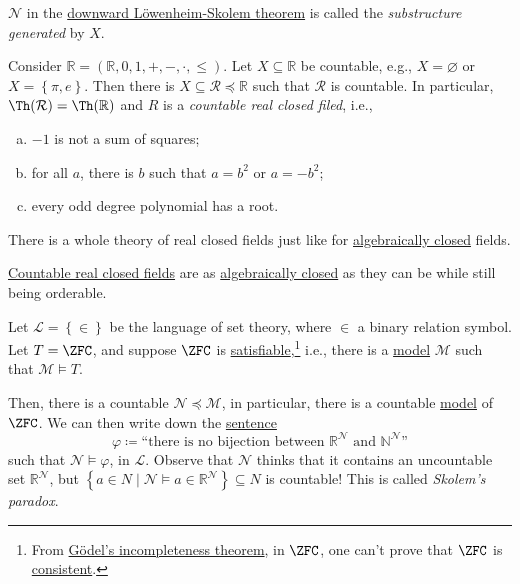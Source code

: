 \begin{notation}\label{not:generated-substructure}
	\(\mathcal{N} \) in the \hyperref[thm:downward-Lowenheim-Skolem]{downward Löwenheim-Skolem theorem} is called the \emph{substructure generated} by \(X\).
\end{notation}

\begin{eg}\label{eg:countable-real-closed-filed}
	Consider \(\mathbb{R} =(\mathbb{R} , 0, 1, +, -, \cdot, \leq )\). Let \(X \subseteq \mathbb{R} \) be countable, e.g., \(X = \varnothing \) or \(X = \left\{ \pi , e \right\} \). Then there is \(X \subseteq \mathcal{R} \preceq \mathbb{R} \) such that \(\mathcal{R}\) is countable. In particular, \(\Th(\mathcal{R} ) = \Th(\mathbb{R})\) and \(R\) is a \emph{countable real closed filed}, i.e.,
	\begin{enumerate}[(a)]
		\item \(-1\) is not a sum of squares;
		\item for all \(a\), there is \(b\) such that \(a = b^2\) or \(a=-b^2\);
		\item every odd degree polynomial has a root.
	\end{enumerate}
	There is a whole theory of real closed fields just like for \hyperref[def:algebraically-closed]{algebraically closed} fields.
\end{eg}

\begin{intuition}
	\hyperref[eg:countable-real-closed-filed]{Countable real closed fields} are as \hyperref[def:algebraically-closed]{algebraically closed} as they can be while still being orderable.
\end{intuition}

\begin{eg}
	Let \(\mathcal{L} = \left\{ \in\right\} \) be the language of set theory, where \(\in\) a binary relation symbol. Let \(T=\ZFC \), and suppose \(\ZFC \) is \hyperref[def:satisfiable]{satisfiable},\footnote{From \href{https://en.wikipedia.org/wiki/Gödel's_incompleteness_theorems}{Gödel's incompleteness theorem}, in \(\ZFC \), one can't prove that \(\ZFC \) is \hyperref[def:consistent]{consistent}.} i.e., there is a \hyperref[def:model]{model} \(\mathcal{M} \) such that \(\mathcal{M} \models T\).

	Then, there is a countable \(\mathcal{N} \preceq \mathcal{M} \), in particular, there is a countable \hyperref[def:model]{model} of \(\ZFC \). We can then write down the \hyperref[def:sentence]{sentence}
	\[
		\varphi \coloneqq \text{``there is no bijection between \(\mathbb{R} ^\mathcal{N} \) and \(\mathbb{N} ^\mathcal{N} \)''}
	\]
	such that \(\mathcal{N} \models \varphi \), in \(\mathcal{L} \). Observe that \(\mathcal{N} \) thinks that it contains an uncountable set \(\mathbb{R} ^\mathcal{N} \), but \(\left\{ a\in N \mid \mathcal{N} \models a\in \mathbb{R} ^\mathcal{N} \right\} \subseteq N\) is countable! This is called \emph{Skolem's paradox}.
\end{eg}

